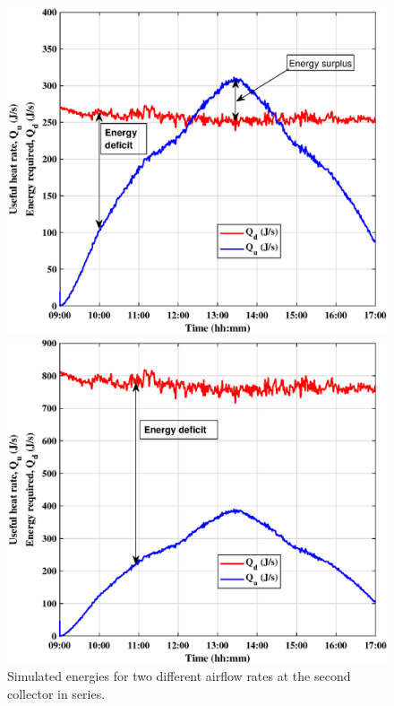 \begin{figure}[ht!]
	\begin{minipage}{0.50\columnwidth}
		\includegraphics[scale=0.45]{figs/dry_low_2col.eps}
		
	\end{minipage}
	\begin{minipage}{0.50\columnwidth}
		\includegraphics[scale=0.45]{figs/dry_high_2col.eps}
		
	\end{minipage}
	\caption{Simulated energies for two different airflow rates at the second collector in series.}
	\label{dry_2col}
\end{figure}


